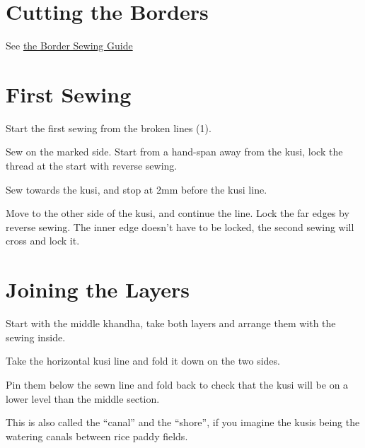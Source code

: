 
\section{Cutting the Borders}

See \href{/en/borders}{the Border Sewing Guide}

\section{First Sewing}

Start the first sewing from the broken lines (1).



Sew on the marked side. Start from a hand-span away from the kusi, lock
the thread at the start with reverse sewing.

Sew towards the kusi, and stop at 2mm before the kusi line.

Move to the other side of the kusi, and continue the line. Lock the far
edges by reverse sewing. The inner edge doesn't have to be locked, the
second sewing will cross and lock it.


\section{Joining the Layers}

Start with the middle khandha, take both layers and arrange them with
the sewing inside.

Take the horizontal kusi line and fold it down on the two sides.


Pin them below the sewn line and fold back to check that the kusi will
be on a lower level than the middle section.



This is also called the ``canal'' and the ``shore'', if you imagine the
kusis being the watering canals between rice paddy fields.

